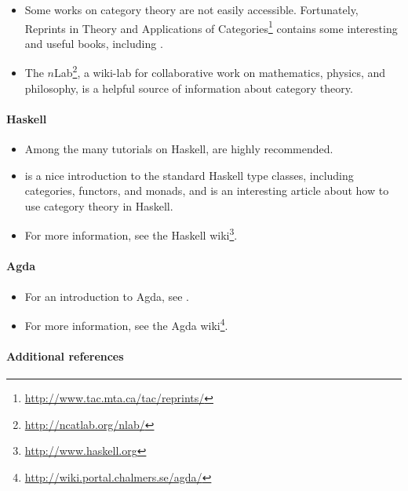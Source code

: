 \begin{itemize}
\item
  Some works on category theory are not easily accessible.
  Fortunately, Reprints in Theory and Applications of
  Categories\footnote{\url{http://www.tac.mta.ca/tac/reprints/}}
  contains some interesting and useful books, including
  \parencites{adamek-et-al-2006}{barr-wells-2005}{barr-wells-2012}.

\item
  The $n$Lab\footnote{\url{http://ncatlab.org/nlab/}}, a wiki-lab for
  collaborative work on mathematics, physics, and philosophy, is a
  helpful source of information about category theory.

\end{itemize}

\paragraph{Haskell}

\begin{itemize}
\item
  Among the many tutorials on Haskell,
  \parencites{lipovaca-2011}{osullivan-et-al-2008} are highly
  recommended.

\item
  \parencite{yorgey-2009} is a nice introduction to the standard
  Haskell type classes, including categories, functors, and monads,
  and \parencite{elkins-2009} is an interesting article about how to
  use category theory in Haskell.

\item
  For more information, see the Haskell
  wiki\footnote{\url{http://www.haskell.org}}.

\end{itemize}

\paragraph{Agda}

\begin{itemize}
\item
  For an introduction to Agda, see
  \parencites{bove-dybjer-2009}{norell-2009}.

\item
  For more information, see the Agda
  wiki\footnote{\url{http://wiki.portal.chalmers.se/agda/}}.

\end{itemize}

\paragraph{Additional references}

